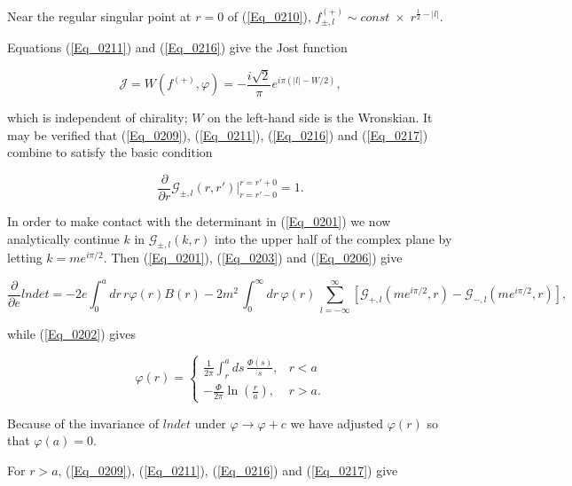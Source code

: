 \documentclass[a4paper,twocolumn,showpacs,preprintnumbers,amsmath,amssymb]{revtex4}
\newcommand{\half}{\frac{1}{2}}
\newcommand{\pdo}[1]{\ensuremath{\frac{\partial }
        {\partial #1 }}}
\begin{document}
\noindent
Near the regular singular point at $r = 0$ of (\ref{Eq_0210}),
$f^{(+)}_{\pm,l} \sim const \; \times \; r^{\half - |l|}$.

Equations (\ref{Eq_0211}) and (\ref{Eq_0216}) give the Jost function

\begin{equation}
\label{Eq_0217}
\mathcal{J} = W(f^{(+)}, \varphi)
	= - \frac{i\sqrt{2}}{\pi} e^{i\pi(|l| - W/2)},
\end{equation}

\noindent
which is independent of chirality; $W$ on the left-hand side is the
Wronskian. It may be verified that (\ref{Eq_0209}), (\ref{Eq_0211}),
(\ref{Eq_0216}) and (\ref{Eq_0217}) combine to satisfy the basic
condition


\begin{equation}
\label{Eq_0218}
\pdo{r} \mathcal{G}_{\pm,l}(r, r')
	|^{r = r' + 0}_{r = r' - 0} = 1.
\end{equation}

In order to make contact with the determinant in (\ref{Eq_0201}) we now
analytically continue $k$ in $\mathcal{G}_{\pm,l}(k,r)$ into the upper
half of the complex plane by letting $k = me^{i\pi/2}$. Then
(\ref{Eq_0201}), (\ref{Eq_0203}) and (\ref{Eq_0206}) give

\begin{widetext}
\begin{equation}
\label{Eq_0219}
\pdo{e} lndet = -2e \int^{a}_{0} dr \, r \varphi(r) B(r)
  -2 m^2 \, \int^{\infty}_0 dr \, \varphi(r) \,
  \sum^{\infty}_{l=-\infty}
  \left[
  \mathcal{G}_{+,l} (me^{i\pi/2},r) - \mathcal{G}_{-,l} (me^{i\pi/2},r)
  \right],
\end{equation}
\end{widetext}

\noindent
while (\ref{Eq_0202}) gives

\begin{equation}
\label{Eq_0220}
\varphi(r) =
\begin{cases}
\displaystyle
\frac{1}{2\pi} \int^a_r ds \, \frac{\Phi(s)}{s},& r < a\\[3mm]
\displaystyle
- \frac{\Phi}{2\pi} \ln\left(\frac{r}{a}\right), & r > a.
\end{cases}
\end{equation}

\noindent
Because of the invariance of $lndet$ under $\varphi \to \varphi + c$
we have adjusted $\varphi(r)$ so that $\varphi(a) = 0$.

For $r > a$, (\ref{Eq_0209}), (\ref{Eq_0211}), (\ref{Eq_0216}) and
(\ref{Eq_0217}) give
\end{document}
